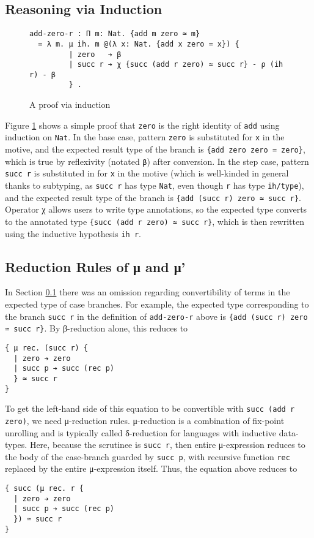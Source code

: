 \documentclass{article}
\begin{document}
\subsection{Reasoning via Induction}
\label{sec:induction}
\begin{figure}[h]
\begin{verbatim}
add-zero-r : Π m: Nat. {add m zero ≃ m}
  = λ m. μ ih. m @(λ x: Nat. {add x zero ≃ x}) {
         | zero   ➔ β
         | succ r ➔ χ {succ (add r zero) ≃ succ r} - ρ (ih r) - β
         } .
\end{verbatim}
  \caption{A proof via induction}
  \label{fig:ex-data-ind}
\end{figure}
Figure \ref{fig:ex-data-ind} shows a simple proof that \texttt{zero} is the
right identity of \texttt{add} using induction on \texttt{Nat}. In the base
case, pattern \texttt{zero} is substituted for \texttt{x} in the motive, and
the expected result type of the branch is \texttt{\{add zero zero ≃ zero\}},
which is true by reflexivity (notated \texttt{β}) after conversion. In the step case, pattern
\texttt{succ r} is substituted in for \texttt{x} in the motive (which is
well-kinded in general thanks to subtyping, as \texttt{succ r} has type
\texttt{Nat}, even though \texttt{r} has type \texttt{ih/type}), and the
expected result type of the branch is \texttt{\{add (succ r) zero ≃ succ r\}}.
Operator χ allows users to write type annotations, so the expected type converts
to the annotated type \texttt{\{succ (add r zero) ≃ succ r\}}, which is then
rewritten using the inductive hypothesis \texttt{ih r}.

\subsection{Reduction Rules of μ and μ'}
In Section \ref{sec:induction} there was an omission regarding convertibility of
terms in the expected type of case branches. For example, the expected type
corresponding to the branch \texttt{succ r} in the definition of
\texttt{add-zero-r} above is \texttt{\{add (succ r) zero ≃ succ r\}}. By
β-reduction alone, this reduces to
\begin{verbatim}
{ μ rec. (succ r) {
  | zero ➔ zero
  | succ p ➔ succ (rec p)
  } ≃ succ r
}
\end{verbatim}

To get the left-hand side of this equation to be convertible with \texttt{succ
  (add r zero)}, we need μ-reduction rules. μ-reduction is a combination of
fix-point unrolling and is typically called δ-reduction for languages with
inductive data-types. Here, because the scrutinee is \texttt{succ r}, then
entire μ-expression reduces to the body of the case-branch guarded by
\texttt{succ p}, with recursive function \texttt{rec} replaced by the entire
μ-expression itself. Thus, the equation above reduces to
\begin{verbatim}
{ succ (μ rec. r {
  | zero ➔ zero
  | succ p ➔ succ (rec p)
  }) ≃ succ r
}
\end{verbatim}
\end{document}

